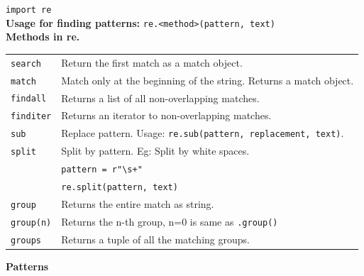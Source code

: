 \texttt{import re}\\
\textbf{Usage for finding patterns:} \texttt{re.<method>(pattern, text)}\\

\textbf{Methods in re.}\\
\begin{tabularx}{\linewidth}{lX}
    \texttt{search}         & Return the first match as a match object.\\
    \texttt{match}          & Match only at the beginning of the string. Returns a match object.\\
    \texttt{findall}        & Returns a list of all non-overlapping matches.\\
    \texttt{finditer}       & Returns an iterator to non-overlapping matches.\\
    \texttt{sub}            & Replace pattern. Usage: \texttt{re.sub(pattern, replacement, text)}.\\
    \texttt{split}          & Split by pattern. Eg: Split by white spaces.\\
                            & \texttt{pattern = r"\textbackslash s+"}\\
                            & \texttt{re.split(pattern, text)}\\
    \texttt{group}          & Returns the entire match as string.\\
    \texttt{group(n)}       & Returns the n-th group, n=0 is same as \texttt{.group()}\\
    \texttt{groups}         & Returns a tuple of all the matching groups.\\
\end{tabularx}

\textbf{Patterns}

